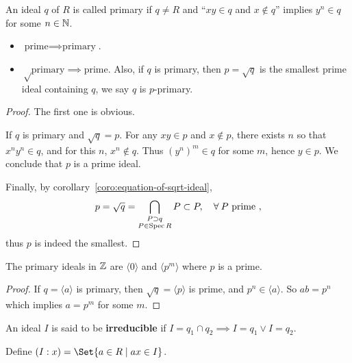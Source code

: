 \begin{definition}
  An ideal $q$ of $R$ is called primary if $q \neq R$ and ``$xy \in q$ and $x \not\in q$''
  implies $y^n \in q$ for some $n \in \mathbb{N}$.
\end{definition}

\begin{prop} \hfill
  \begin{itemize}
    \item $\text{prime} \implies \text{primary}$.
    \item $\sqrt\text{primary} \implies \text{prime}$. Also, if $q$ is primary, then $p = \sqrt{q}$
      is the smallest prime ideal containing $q$, we say $q$ is $p$-primary.
  \end{itemize}

  \begin{proof}
    The first one is obvious.

    If $q$ is primary and $\sqrt{q} = p$. For any $xy \in p$ and $x \not\in p$,
    there exists $n$ so that $x^n y^n \in q$, and for this $n$, $x^n \not\in q$.
    Thus $(y^n)^m \in q$ for some $m$, hence $y \in p$. We conclude that $p$ is a prime ideal.

    Finally, by corollary~\ref{coro:equation-of-sqrt-ideal},
    \[ p = \sqrt{q} = \bigcap_{\substack{P \supset q \\ P \in \Spec R}} P \subset P, \quad \forall P \text{ prime }, \]
    thus $p$ is indeed the smallest.
  \end{proof}
\end{prop}

\begin{example}
  The primary ideals in $\mathbb{Z}$ are $\langle 0 \rangle$ and $\langle p^m \rangle$
  where $p$ is a prime.

  \begin{proof}
    If $q = \langle a \rangle$ is primary, then $\sqrt{q} = \langle p \rangle$ is
    prime, and $p^n \in \langle a \rangle$. So $ab = p^n$ which implies $a = p^m$
    for some $m$.
  \end{proof}
\end{example}

\begin{definition}
  An ideal $I$ is said to be {\bf irreducible} 
  if $I = q_1 \cap q_2 \implies I = q_1 \lor I = q_2$.
\end{definition}

\begin{definition}
  Define $(I: x) = \Set{ a \in R \mid ax \in I}$.
\end{definition}

